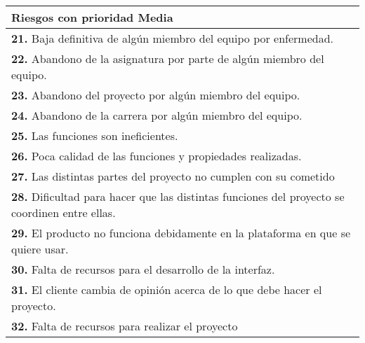 \documentclass[spanish,a4paper,12pt]{report}	%
\begin{document}
			\begin{tabular}{|p{12cm}|}
				\hline
				\textbf{Riesgos con prioridad Media}\\ \hline \hline
				\textbf{21.} Baja definitiva de algún miembro del equipo por enfermedad.\\ \hline 
				\textbf{22.} Abandono de la asignatura por parte de algún miembro del equipo.\\ \hline
				\textbf{23.} Abandono del proyecto por algún miembro del equipo. \\ \hline
				\textbf{24.} Abandono de la carrera por algún miembro del equipo. \\ \hline
				\textbf{25.} Las funciones son ineficientes.\\ \hline
				\textbf{26.} Poca calidad de las funciones y propiedades realizadas. \\ \hline
				\textbf{27.} Las distintas partes del proyecto no cumplen con su cometido \\ \hline
				\textbf{28.} Dificultad para hacer que las distintas funciones del proyecto se coordinen entre ellas. \\ \hline
				\textbf{29.} El producto no funciona debidamente en la plataforma en que se quiere usar. \\ \hline
				\textbf{30.} Falta de recursos para el desarrollo de la interfaz. \\ \hline
				\textbf{31.} El cliente cambia de opinión acerca de lo que debe hacer el proyecto. \\ \hline
				\textbf{32.} Falta de recursos para realizar el proyecto \\ \hline
			\end{tabular}
			
				\ \\
				\ \\
			
\end{document}
